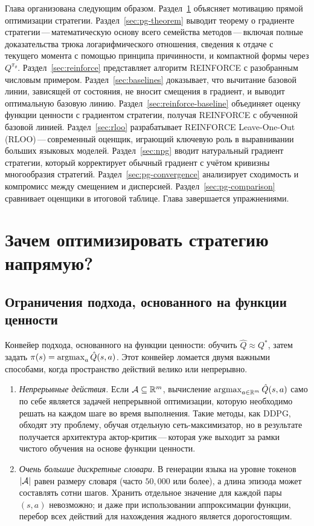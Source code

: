 Глава организована следующим образом. Раздел~\ref{sec:pg-why} объясняет мотивацию прямой оптимизации стратегии. Раздел~\ref{sec:pg-theorem} выводит теорему о градиенте стратегии\,---\,математическую основу всего семейства методов\,---\,включая полные доказательства трюка логарифмического отношения, сведения к отдаче с текущего момента с помощью принципа причинности, и компактной формы через $Q^{\pi_\theta}$. Раздел~\ref{sec:reinforce} представляет алгоритм REINFORCE с разобранным числовым примером. Раздел~\ref{sec:baselines} доказывает, что вычитание базовой линии, зависящей от состояния, не вносит смещения в градиент, и выводит оптимальную базовую линию. Раздел~\ref{sec:reinforce-baseline} объединяет оценку функции ценности с градиентом стратегии, получая REINFORCE с обученной базовой линией. Раздел~\ref{sec:rloo} разрабатывает REINFORCE Leave-One-Out (RLOO)\,---\,современный оценщик, играющий ключевую роль в выравнивании больших языковых моделей. Раздел~\ref{sec:npg} вводит натуральный градиент стратегии, который корректирует обычный градиент с учётом кривизны многообразия стратегий. Раздел~\ref{sec:pg-convergence} анализирует сходимость и компромисс между смещением и дисперсией. Раздел~\ref{sec:pg-comparison} сравнивает оценщики в итоговой таблице. Глава завершается упражнениями.

\section{Зачем оптимизировать стратегию напрямую?}
\label{sec:pg-why}

\subsection{Ограничения подхода, основанного на функции ценности}

Конвейер подхода, основанного на функции ценности: обучить $\hat Q \approx Q^*$, затем задать $\pi(s) = \operatorname*{argmax}_a \hat Q(s,a)$. Этот конвейер ломается двумя важными способами, когда пространство действий велико или непрерывно.

\begin{enumerate}[leftmargin=*]
\item \textit{Непрерывные действия.}  Если $\mathcal{A} \subseteq \mathbb{R}^m$, вычисление $\operatorname*{argmax}_{a \in \mathbb{R}^m} \hat Q(s,a)$ само по себе является задачей непрерывной оптимизации, которую необходимо решать на каждом шаге во время выполнения. Такие методы, как DDPG, обходят эту проблему, обучая отдельную сеть-максимизатор, но в результате получается архитектура актор-критик\,---\,которая уже выходит за рамки чистого обучения на основе функции ценности.

\item \textit{Очень большие дискретные словари.}  В генерации языка на уровне токенов $|\mathcal{A}|$ равен размеру словаря (часто $50{,}000$ или более), а длина эпизода может составлять сотни шагов. Хранить отдельное значение для каждой пары $(s,a)$ невозможно; и даже при использовании аппроксимации функции, перебор всех действий для нахождения жадного является дорогостоящим.
\end{enumerate}

